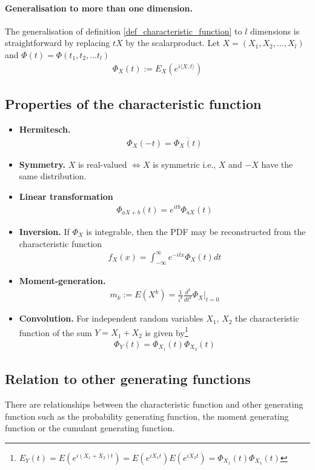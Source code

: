\documentclass[10pt,a4paper]{article}
\begin{document}
\paragraph*{Generalisation to more than one dimension.} The generalisation of definition  \ref{def_characteristic_function} to $l$ dimensions is straightforward by replacing $tX$ by the scalarproduct. Let $X=(X_1, X_2, \dots, X_l)$ and $\Phi(t) = \Phi(t_1, t_2, \dots t_l) $
\begin{align}
\Phi_X(t) := E_X\left(e^{i\langle X, t \rangle}\right)
\end{align}



\subsection{Properties of the characteristic function}
\begin{itemize}
\item \textbf{Hermitesch.} 
\begin{align}
\Phi_X(-t) =  \overline{\Phi_X(t)} 
\end{align}
\item \textbf{Symmetry.} $X$ is real-valued $\Leftrightarrow X$ is symmetric
i.e., $X$ and $-X$ have the same distribution.
\item \textbf{Linear transformation} 
\begin{align}
\Phi_{aX+b}(t) = e^{itb} \Phi_{aX}(t) 
\end{align}
\item \textbf{Inversion.} If $\Phi_X$ is integrable, then the PDF may be reconstructed from the characteristic function
\begin{align}
f_X(x) = \int_{-\infty}^{\infty} e^{-itx} \Phi_X(t) dt
\end{align}
\item \textbf{Moment-generation.}
\begin{align}
m_k := E(X^k) = \frac{1}{i^k}\frac{d^k}{dt^ k} \Phi_X \bigg \rvert_{t=0}
\end{align}
\item \textbf{Convolution.} For independent random variables $X_1$, $X_2$ the characteristic function of the sum $Y=X_1 + X_2$ is given by\footnote{$E_Y(t) = E(e^{i(X_1+X_2)t}) = E(e^{iX_1t})E(e^{iX_2t})=\Phi_{X_1}(t)\Phi_{X_1}(t)$  }
\begin{align}
\Phi_Y(t) = \Phi_{X_1}(t)\Phi_{X_2}(t) 
\end{align} 
\end{itemize}
\subsection{Relation to other generating functions}
There are relationships between the characteristic function and other generating function such as the probability generating function, the moment generating function or the cumulant generating function.
\end{document}
